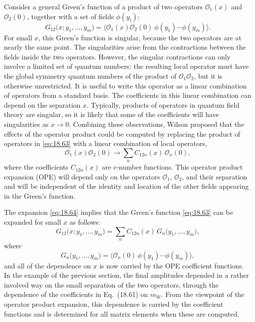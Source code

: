 Consider a general Green's function of a product of two operators
$\mathcal{O}_1(x)$ and $\mathcal{O}_2(0)$, together with a set of fields
$\phi(y_i)$:
\begin{equation}
  G_{12}\bigl( x; y_1, \ldots, y_m \bigr)
  = \bigl\langle \mathcal{O}_1(x)\mathcal{O}_2(0)\ \phi(y_1)\cdots\phi(y_m)
    \bigr\rangle .
  \label{eq:18.63}
\end{equation}
For small $x$, this Green's function is singular, because the two operators
are at nearly the same point.  The singularities arise from the contractions
between the fields inside the two operators.  However, the singular
contractions can only involve a limited set of quantum numbers: the resulting
local operator must have the global symmetry quantum numbers of the product
of $\mathcal{O}_1\mathcal{O}_2$, but it is otherwise unrestricted.  It is useful
to write this operator as a linear combination of operators from a standard
basis.  The coefficients in this linear combination can depend on the
separation $x$.  Typically, products of operators in quantum field theory are
singular, so it is likely that some of the coefficients will have singularities
as $x\to 0$.  Combining these observations, Wilson proposed that the effects
of the operator product could be computed by replacing the product of
operators in \eqref{eq:18.63} with a linear combination of local operators,
\begin{equation}
  \mathcal{O}_1(x)\mathcal{O}_2(0) \to \sum_n C_{12n}(x)\,
    \mathcal{O}_n(0) ,
  \label{eq:18.64}
\end{equation}
where the coefficients $C_{12n}(x)$ are c-number functions.  This operator
product expansion (OPE) will depend only on the operators
$\mathcal{O}_1$, $\mathcal{O}_2$, and their separation and will be independent
of the identity and location of the other fields appearing in the Green's
function.

The expansion \eqref{eq:18.64} implies that the Green's function
\eqref{eq:18.63} can be expanded for small $x$ as follows:
\begin{equation}
  G_{12}\bigl( x; y_1, \ldots, y_m \bigr) = \sum_n C_{12n}(x)\,
    G_n\bigl( y_1, \ldots, y_m \bigr) ,
  \label{eq:18.65}
\end{equation}
where
\begin{equation}
  G_n\bigl( y_1, \ldots, y_m \bigr) = \bigl\langle \mathcal{O}_n(0)\,
    \phi(y_1)\cdots\phi(y_m) \bigr\rangle ,
  \label{eq:18.66}
\end{equation}
and all of the dependence on $x$ is now carried by the OPE coefficient
functions.  In the example of the previous section, the final amplitudes
depended in a rather involved way on the small separation of the two
operators, through the dependence of the coefficients in Eq.~(18.61) on
$m_W$.  From the viewpoint of the operator product expansion, this dependence
is carried by the coefficient functions and is determined for all matrix
elements when these are computed.

